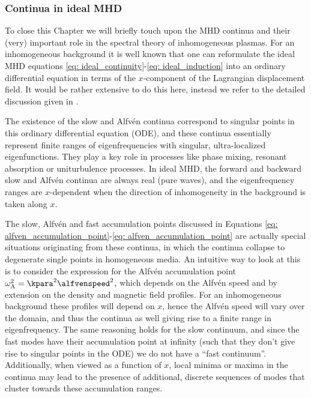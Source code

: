 \subsubsection{Continua in ideal MHD}
To close this Chapter we will briefly touch upon the MHD continua and their (very) important role in the spectral theory of inhomogeneous plasmas. For an inhomogeneous background it is well known that one can reformulate the ideal MHD equations \eqref{eq: ideal_continuity}-\eqref{eq: ideal_induction} into an ordinary differential equation in terms of the $x$-component of the Lagrangian displacement field. It would be rather extensive to do this here, instead we refer to the detailed discussion given in \citet{book_MHD}.

The existence of the slow and Alfv\'en continua correspond to singular points in this ordinary differential equation (ODE), and these continua essentially represent finite ranges of eigenfrequencies with singular, ultra-localized eigenfunctions. They play a key role in processes like phase mixing, resonant absorption or uniturbulence processes. In ideal MHD, the forward and backward slow and Alfv\'en continua are always real (pure waves), and the eigenfrequency ranges are $x$-dependent when the direction of inhomogeneity in the background is taken along $x$.

The slow, Alfv\'en and fast accumulation points discussed in Equations \eqref{eq: alfven_accumulation_point}-\eqref{eq: alfven_accumulation_point} are actually special situations originating from these continua, in which the continua collapse to degenerate single points in homogeneous media. An intuitive way to look at this is to consider the expression for the Alfv\'en accumulation point $\omega_\text{A}^2 = \kpara^2\alfvenspeed^2$, which depends on the Alfv\'en speed and by extension on the density and magnetic field profiles. For an inhomogeneous background these profiles will depend on $x$, hence the Alfv\'en speed will vary over the domain, and thus the continua as well giving rise to a finite range in eigenfrequency. The same reasoning holds for the slow continuum, and since the fast modes have their accumulation point at infinity (such that they don't give rise to singular points in the ODE) we do not have a ``fast continuum''. Additionally, when viewed as a function of $x$, local minima or maxima in the continua may lead to the presence of additional, discrete sequences of modes that cluster towards these accumulation ranges.

